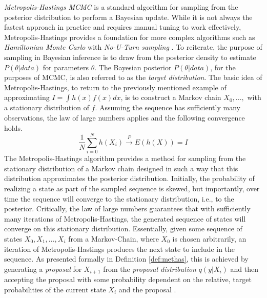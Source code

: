 \documentclass[
  12pt,
  twoside]{book}
\theoremstyle{definition}
\theoremstyle{definition}
\theoremstyle{definition}
\theoremstyle{remark}
\begin{document}
\emph{Metropolis-Hastings MCMC} is a standard algorithm for sampling from the posterior distribution to perform a Bayesian update.
While it is not always the fastest approach in practice and requires manual tuning to work effectively, Metropolis-Hastings provides a foundation for more complex algorithms such as \emph{Hamiltonian Monte Carlo} \citep{Brooks2011} with \emph{No-U-Turn sampling} \citep{Homan2014}.
To reiterate, the purpose of sampling in Bayesian inference is to draw from the posterior density to estimate \(P(\theta|data)\) for parameters \(\theta\).
The Bayesian posterior \(P(\theta|data)\), for the purposes of MCMC, is also referred to as the \emph{target distribution}.
The basic idea of Metropolis-Hastings, to return to the previously mentioned example of approximating \(I=\int h(x)f(x)dx\), is to construct a Markov chain \(X_0,...,\) with a stationary distribution of \(f\).
Assuming the sequence has sufficiently many observations, the law of large numbers applies and the following convergence holds.
\[\frac{1}{N}\sum_{i=0}^{N}h(X_{i})\xrightarrow{P} E(h(X))=I\]
The Metropolis-Hastings algorithm provides a method for sampling from the stationary distribution of a Markov chain designed in such a way that this distribution approximates the posterior distribution.
Initially, the probability of realizing a state as part of the sampled sequence is skewed, but importantly, over time the sequence will converge to the stationary distribution, i.e., to the posterior.
Critically, the law of large numbers guarantees that with sufficiently many iterations of Metropolis-Hastings, the generated sequence of states will converge on this stationary distribution.
Essentially, given some sequence of states \(X_{0},X_{1},...,X_{i}\) from a Markov-Chain, where \(X_{0}\) is chosen arbitrarily, an iteration of Metropolis-Hastings produces the next state to include in the sequence.
As presented formally in Definition \ref{def:methas}, this is achieved by generating a \emph{proposal} for \(X_{i+1}\) from the \emph{proposal distribution} \(q(y|X_{i})\) and then accepting the proposal with some probability dependent on the relative, target probabilities of the current state \(X_{i}\) and the proposal \citep[  24.4]{Wasserman2004}.
\end{document}
